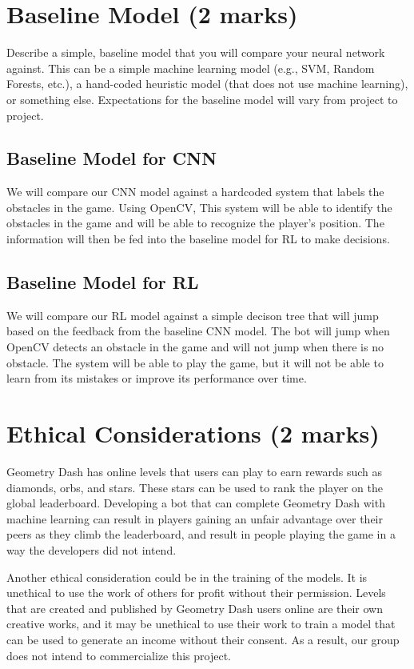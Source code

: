 \documentclass{article} %
\begin{document}
\section{Baseline Model (2 marks)}
Describe a simple, baseline model that you will compare your neural
network against. This can be a simple machine learning model (e.g., SVM, Random Forests, etc.), a hand-coded heuristic model (that does not use machine learning), or something else. Expectations for the baseline model will vary from project to project.

\subsection{Baseline Model for CNN}
We will compare our CNN model against a hardcoded system 
that labels the obstacles in the game. Using OpenCV, This system will
be able to identify the obstacles in the game and will 
be able to recognize the player's position. The information 
will then be fed into the baseline model for RL to make decisions.
\subsection{Baseline Model for RL}
We will compare our RL model against a simple decison tree that
will jump based on the feedback from the baseline CNN model.
The bot will jump when OpenCV detects an obstacle in the
game and will not jump when there is no obstacle. The system will 
be able to play the game, but it will not be able to learn from
its mistakes or improve its performance over time.






\section{Ethical Considerations (2 marks)}
Geometry Dash has online levels that users can play to earn rewards 
such as diamonds, orbs, and stars. These stars can be used to rank 
the player on the global leaderboard. Developing a bot that can complete 
Geometry Dash with machine learning can result in players gaining an 
unfair advantage over their peers as they climb the leaderboard, and 
result in people playing the game in a way the developers did not intend.

Another ethical consideration could be in the training of the models. 
It is unethical to use the work of others for profit without their 
permission. Levels that are created and published by Geometry Dash 
users online are their own creative works, and it may be unethical to 
use their work to train a model that can be used to generate an income 
without their consent. As a result, our group does not intend to 
commercialize this project.
\end{document}
